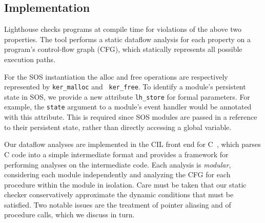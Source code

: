 % 
% 
% 


\subsection{Implementation}

Lighthouse checks programs at compile time for violations of the above
two properties.  The tool performs a static dataflow analysis for each
property on a program's control-flow graph (CFG), which statically
represents all possible execution paths.  

For the SOS instantiation the $\mathrm{alloc}$ and $\mathrm{free}$
operations are respectively represented by {\tt ker\_malloc} and {\tt
ker\_free}.  To identify a module's persistent state in SOS, we
provide a new attribute {\tt lh\_store} for formal parameters.  For
example, the {\tt state} argument to a module's event handler would be
annotated with this attribute.  This is required since SOS modules are
passed in a reference to their persistent state, rather than directly accessing a
global variable.

Our dataflow analyses are implemented in the CIL front end for
C~\cite{CIL}, which parses C code into a simple intermediate format
and provides a framework for performing analyses on the intermediate
code.  Each analysis is {\em modular}, considering each module
independently and analyzing the CFG for each procedure within the
module in isolation.  Care must be taken that our static checker
conservatively approximate the dynamic conditions that must be
satisfied.  Two notable issues are the treatment of pointer aliasing
and of procedure calls, which we discuss in turn.

